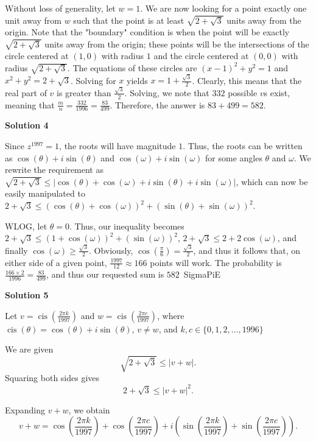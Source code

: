 \begin{enumerate}
 Without loss of generality, let $w = 1$. We are now looking for a point exactly one unit away from $w$ such that the point is at least $\sqrt{2 + \sqrt{3}}$ units away from the origin. Note that the "boundary" condition is when the point will be exactly $\sqrt{2+\sqrt{3}}$ units away from the origin; these points will be the intersections of the circle centered at $(1,0)$ with radius $1$ and the circle centered at $(0,0)$ with radius $\sqrt{2+\sqrt{3}}$. The equations of these circles are $(x-1)^2 + y^2 = 1$ and $x^2 + y^2 = 2 + \sqrt{3}$. Solving for $x$ yields $x = 1 + \frac{\sqrt{3}}{2}$. Clearly, this means that the real part of $v$ is greater than $\frac{\sqrt{3}}{2}$. Solving, we note that $332$ possible $v$s exist, meaning that $\frac{m}{n} = \frac{332}{1996} = \frac{83}{499}$. Therefore, the answer is $83 + 499 = \boxed{582}$.

 



\textbf{Solution 4}

Since $z^{1997}=1$, the roots will have magnitude $1$. Thus, the roots can be written as $\cos(\theta)+i\sin(\theta)$ and $\cos(\omega)+i\sin(\omega)$ for some angles $\theta$ and $\omega$. We rewrite the requirement as $\sqrt{2+\sqrt3}\le|\cos(\theta)+\cos(\omega)+i\sin(\theta)+i\sin(\omega)|$, which can now be easily manipulated to $2+\sqrt{3}\le(\cos(\theta)+\cos(\omega))^2+(\sin(\theta)+\sin(\omega))^2$. 

 WLOG, let $\theta = 0$. Thus, our inequality becomes $2+\sqrt{3}\le(1+\cos(\omega))^2+(\sin(\omega))^2$, $2+\sqrt{3}\le2+2\cos(\omega)$, and finally $\cos(\omega)\ge\frac{\sqrt{3}}{2}$. Obviously, $\cos(\frac{\pi}{6})=\frac{\sqrt{3}}{2}$, and thus it follows that, on either side of a given point, $\frac{1997}{12}\approx166$ points will work. The probability is $\frac{166\times2}{1996} = \frac{83}{499}$, and thus our requested sum is $\boxed{582}$~SigmaPiE

 



\textbf{Solution 5}

Let \(v = \operatorname{cis}\left(\frac{2\pi k}{1997}\right)\) and  \(w = \operatorname{cis}\left(\frac{2\pi c}{1997}\right)\), where \(\operatorname{cis}\left(\theta\right) = \cos(\theta) + i\sin(\theta)\), \(v \neq w\), and \(k,c \in \{0,1,2,\dots,1996\}\)

 We are given
 \[\sqrt{2+\sqrt{3}} \le |v+w|.\]Squaring both sides gives
 \[2+\sqrt{3} \le |v+w|^2.\]

 Expanding \(v+w\), we obtain
 \[v+w = \cos\!\left(\frac{2\pi k}{1997}\right) + \cos\!\left(\frac{2\pi c}{1997}\right) + i\!\left(\sin\!\left(\frac{2\pi k}{1997}\right) + \sin\!\left(\frac{2\pi c}{1997}\right)\right).\]


\end{enumerate}
